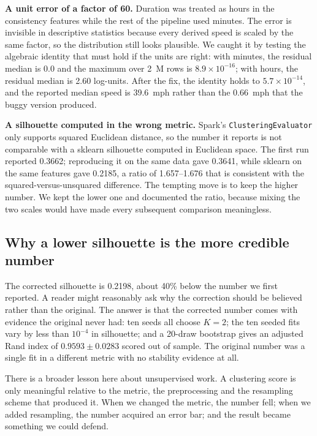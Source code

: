 \documentclass[11pt,a4paper]{article}
\newcommand{\code}[1]{\texttt{\small #1}}
\begin{document}
\textbf{A unit error of a factor of 60.} Duration was treated as hours in the consistency features while the rest of the pipeline used minutes. The error is invisible in descriptive statistics because every derived speed is scaled by the same factor, so the distribution still looks plausible. We caught it by testing the algebraic identity that must hold if the units are right: with minutes, the residual median is 0.0 and the maximum over 2~M rows is $8.9 \times 10^{-16}$; with hours, the residual median is 2.60 log-units. After the fix, the identity holds to $5.7 \times 10^{-14}$, and the reported median speed is 39.6~mph rather than the 0.66~mph that the buggy version produced.

\textbf{A silhouette computed in the wrong metric.} Spark's \code{ClusteringEvaluator} only supports squared Euclidean distance, so the number it reports is not comparable with a sklearn silhouette computed in Euclidean space. The first run reported 0.3662; reproducing it on the same data gave 0.3641, while sklearn on the same features gave 0.2185, a ratio of 1.657--1.676 that is consistent with the squared-versus-unsquared difference. The tempting move is to keep the higher number. We kept the lower one and documented the ratio, because mixing the two scales would have made every subsequent comparison meaningless.

\subsection{Why a lower silhouette is the more credible number}

The corrected silhouette is 0.2198, about 40\% below the number we first reported. A reader might reasonably ask why the correction should be believed rather than the original. The answer is that the corrected number comes with evidence the original never had: ten seeds all choose $K=2$; the ten seeded fits vary by less than $10^{-4}$ in silhouette; and a 20-draw bootstrap gives an adjusted Rand index of $0.9593 \pm 0.0283$ scored out of sample. The original number was a single fit in a different metric with no stability evidence at all.

There is a broader lesson here about unsupervised work. A clustering score is only meaningful relative to the metric, the preprocessing and the resampling scheme that produced it. When we changed the metric, the number fell; when we added resampling, the number acquired an error bar; and the result became something we could defend.
\end{document}

